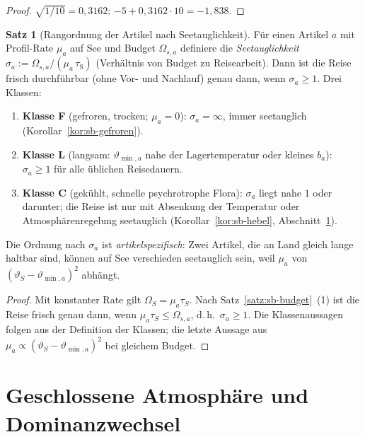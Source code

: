 \documentclass[a4paper, 12pt, twoside, openright]{report}
\theoremstyle{definition}
\theoremstyle{definition}
\newtheorem{satz}{Satz}[chapter]
\begin{document}
\begin{proof}
$\sqrt{1/10}=0{,}3162$; $-5+0{,}3162\cdot10=-1{,}838$.
\end{proof}

\begin{satz}[Rangordnung der Artikel nach Seetauglichkeit]\label{satz:sb-artikel}
Für einen Artikel $a$ mit Profil-Rate $\mu_a$ auf See und Budget $\Omega_{s,a}$ definiere die
\emph{Seetauglichkeit} $\sigma_a:=\Omega_{s,a}/(\mu_a\,\tau_{\mathrm S})$ (Verhältnis von Budget zu
Reisearbeit). Dann ist die Reise frisch durchführbar (ohne Vor- und Nachlauf) genau dann,
wenn $\sigma_a\ge1$. Drei Klassen:
\begin{enumerate}
  \item \textbf{Klasse F} (gefroren, trocken; $\mu_a=0$): $\sigma_a=\infty$, immer
    seetauglich (Korollar~\ref{kor:sb-gefroren}).
  \item \textbf{Klasse L} (langsam: $\vartheta_{\min,a}$ nahe der Lagertemperatur oder kleines
    $b_a$): $\sigma_a\ge1$ für alle üblichen Reisedauern.
  \item \textbf{Klasse C} (gekühlt, schnelle psychrotrophe Flora): $\sigma_a$ liegt nahe
    $1$ oder darunter; die Reise ist nur mit Absenkung der Temperatur oder Atmosphärenregelung
    seetauglich (Korollar~\ref{kor:sb-hebel}, Abschnitt~\ref{sec:sb-atmo}).
\end{enumerate}
Die Ordnung nach $\sigma_a$ ist \emph{artikelspezifisch}: Zwei Artikel, die an Land
gleich lange haltbar sind, können auf See verschieden seetauglich sein, weil $\mu_a$ von
$(\vartheta_S-\vartheta_{\min,a})^2$ abhängt.
\end{satz}

\begin{proof}
Mit konstanter Rate gilt $\Omega_S=\mu_a\tau_S$. Nach Satz~\ref{satz:sb-budget}~(1) ist die
Reise frisch genau dann, wenn $\mu_a\tau_S\le\Omega_{s,a}$, d.\,h.\ $\sigma_a\ge1$. Die
Klassenaussagen folgen aus der Definition der Klassen; die letzte Aussage aus
$\mu_a\propto(\vartheta_S-\vartheta_{\min,a})^2$ bei gleichem Budget.
\end{proof}

\section{Geschlossene Atmosphäre und Dominanzwechsel}
\label{sec:sb-atmo}
\end{document}
